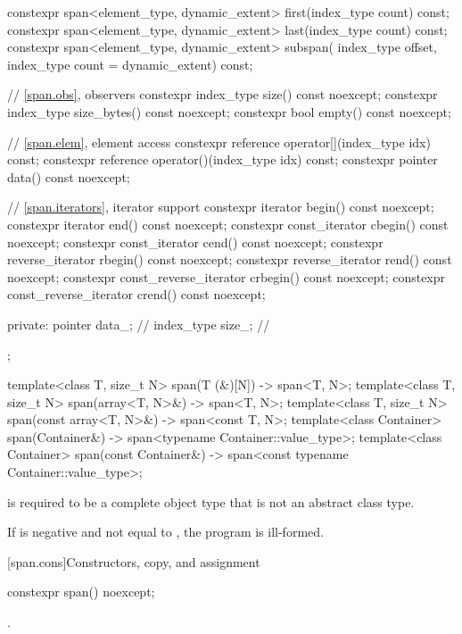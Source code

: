 \begin{codeblock}
\begin{codeblock}
\begin{codeblock}
\begin{codeblock}
{{    constexpr span<element_type, dynamic_extent> first(index_type count) const;
    constexpr span<element_type, dynamic_extent> last(index_type count) const;
    constexpr span<element_type, dynamic_extent> subspan(
      index_type offset, index_type count = dynamic_extent) const;

    // \ref{span.obs}, observers
    constexpr index_type size() const noexcept;
    constexpr index_type size_bytes() const noexcept;
    constexpr bool empty() const noexcept;

    // \ref{span.elem}, element access
    constexpr reference operator[](index_type idx) const;
    constexpr reference operator()(index_type idx) const;
    constexpr pointer data() const noexcept;

    // \ref{span.iterators}, iterator support
    constexpr iterator begin() const noexcept;
    constexpr iterator end() const noexcept;
    constexpr const_iterator cbegin() const noexcept;
    constexpr const_iterator cend() const noexcept;
    constexpr reverse_iterator rbegin() const noexcept;
    constexpr reverse_iterator rend() const noexcept;
    constexpr const_reverse_iterator crbegin() const noexcept;
    constexpr const_reverse_iterator crend() const noexcept;

  private:
    pointer data_;    // \expos
    index_type size_; // \expos
  };

  template<class T, size_t N>
    span(T (&)[N]) -> span<T, N>;
  template<class T, size_t N>
    span(array<T, N>&) -> span<T, N>;
  template<class T, size_t N>
    span(const array<T, N>&) -> span<const T, N>;
  template<class Container>
    span(Container&) -> span<typename Container::value_type>;
  template<class Container>
    span(const Container&) -> span<const typename Container::value_type>;
}
\end{codeblock}

\pnum
{} is required to be
a complete object type that is not an abstract class type.

\pnum
If  is negative and not equal to ,
the program is ill-formed.

[span.cons]{Constructors, copy, and assignment}

%
\begin{itemdecl}
constexpr span() noexcept;
\end{itemdecl}
\begin{itemdescr}
\pnum
\postconditions
{}.


\end{itemdescr}
\end{codeblock}
\end{codeblock}
\end{codeblock}
